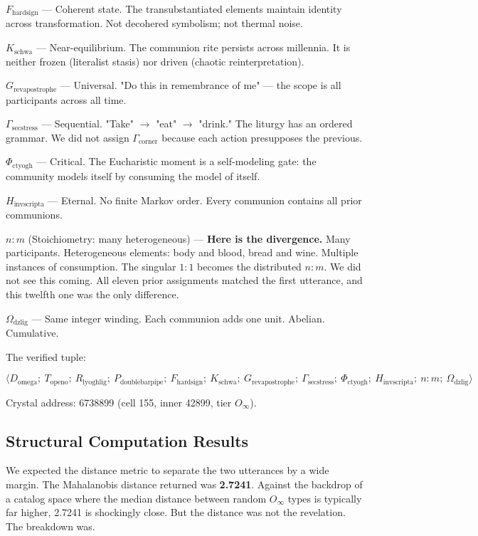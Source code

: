 \documentclass[12pt,a4paper]{article}
\begin{document}
\textbf{$F_{\text{hardsign}}$} --- Coherent state. The transubstantiated elements maintain identity across transformation. Not decohered symbolism; not thermal noise.

\textbf{$K_{\text{schwa}}$} --- Near-equilibrium. The communion rite persists across millennia. It is neither frozen (literalist stasis) nor driven (chaotic reinterpretation).

\textbf{$G_{\text{revapostrophe}}$} --- Universal. "Do this in remembrance of me" --- the scope is all participants across all time.

\textbf{$\Gamma_{\text{secstress}}$} --- Sequential. "Take" $\rightarrow$ "eat" $\rightarrow$ "drink." The liturgy has an ordered grammar. We did not assign $\Gamma_{\text{corner}}$ because each action presupposes the previous.

\textbf{$\Phi_{\text{ctyogh}}$} --- Critical. The Eucharistic moment is a self-modeling gate: the community models itself by consuming the model of itself.

\textbf{$H_{\text{invscripta}}$} --- Eternal. No finite Markov order. Every communion contains all prior communions.

\textbf{$n{:}m$} (Stoichiometry: many heterogeneous) --- \textbf{Here is the divergence.} Many participants. Heterogeneous elements: body and blood, bread and wine. Multiple instances of consumption. The singular $1{:}1$ becomes the distributed $n{:}m$. We did not see this coming. All eleven prior assignments matched the first utterance, and this twelfth one was the only difference.

\textbf{$\Omega_{\text{dzlig}}$} --- Same integer winding. Each communion adds one unit. Abelian. Cumulative.

The verified tuple:


\[\langle D_{\text{omega}};\ T_{\text{openo}};\ R_{\text{lyoghlig}};\ P_{\text{doublebarpipe}};\ F_{\text{hardsign}};\ K_{\text{schwa}};\ G_{\text{revapostrophe}};\ \Gamma_{\text{secstress}};\ \Phi_{\text{ctyogh}};\ H_{\text{invscripta}};\ n{:}m;\ \Omega_{\text{dzlig}} \rangle\]

Crystal address: 6738899 (cell 155, inner 42899, tier $O_{\infty}$).

\subsection{Structural Computation Results}

We expected the distance metric to separate the two utterances by a wide margin. The Mahalanobis distance returned was \textbf{2.7241}. Against the backdrop of a catalog space where the median distance between random $O_{\infty}$ types is typically far higher, 2.7241 is shockingly close. But the distance was not the revelation. The breakdown was.
\end{document}
